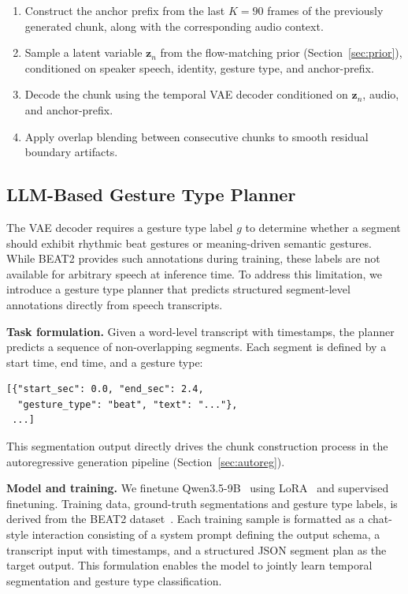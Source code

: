 \begin{enumerate}[leftmargin=*]
    \item Construct the anchor prefix from the last $K = 90$ frames of the previously generated chunk, along with the corresponding audio context.
    \item Sample a latent variable $\mathbf{z}_n$ from the flow-matching prior (Section~\ref{sec:prior}), conditioned on speaker speech, identity, gesture type, and anchor-prefix.
    \item Decode the chunk using the temporal VAE decoder conditioned on $\mathbf{z}_n$, audio, and anchor-prefix.
    \item Apply overlap blending between consecutive chunks to smooth residual boundary artifacts.
\end{enumerate}

\subsection{LLM-Based Gesture Type Planner}
\label{sec:planner}
The VAE decoder requires a gesture type label $g$ to determine whether a segment should exhibit rhythmic beat gestures or meaning-driven semantic gestures.
While BEAT2 provides such annotations during training, these labels are not available for arbitrary speech at inference time.
To address this limitation, we introduce a gesture type planner that predicts structured segment-level annotations directly from speech transcripts.

\noindent \textbf{Task formulation.}
Given a word-level transcript with timestamps, the planner predicts a sequence of non-overlapping segments.
Each segment is defined by a start time, end time, and a gesture type:

\begin{verbatim}
[{"start_sec": 0.0, "end_sec": 2.4,
  "gesture_type": "beat", "text": "..."},
 ...]
\end{verbatim}
This segmentation output directly drives the chunk construction process in the autoregressive generation pipeline (Section~\ref{sec:autoreg}).

\noindent \textbf{Model and training.}
We finetune Qwen3.5-9B~\cite{qwen3} using LoRA~\cite{lora2022} and supervised finetuning.
Training data, ground-truth segmentations and gesture type labels, is derived from the BEAT2 dataset~\cite{emage2024}.
Each training sample is formatted as a chat-style interaction consisting of a system prompt defining the output schema, a transcript input with timestamps, and a structured JSON segment plan as the target output.
This formulation enables the model to jointly learn temporal segmentation and gesture type classification.

